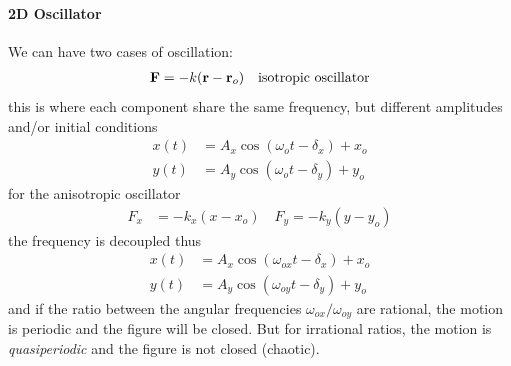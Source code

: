 \documentclass[../main.tex]{subfiles}
\begin{document}
\paragraph*{2D Oscillator} We can have two cases of oscillation:
\begin{align*}
    \vb{F} = -k (\vb{r} - \vb{r}_o) \quad \textrm{isotropic oscillator}
\end{align*}
this is where each component share the same frequency, but different amplitudes and/or initial
conditions
\begin{align*}
    x(t) &= A_x \cos(\omega_o t - \delta_x) + x_o \\
    y(t) &= A_y \cos(\omega_o t - \delta_y) + y_o
\end{align*}
for the anisotropic oscillator
\begin{align*}
    F_x &= -k_x (x - x_o) \quad F_y = -k_y (y - y_o)
\end{align*}
the frequency is decoupled thus
\begin{align*}
    x(t) &= A_x \cos(\omega_{ox} t - \delta_x) + x_o \\
    y(t) &= A_y \cos(\omega_{oy} t - \delta_y) + y_o
\end{align*}
and if the ratio between the angular frequencies $\omega_{ox} / \omega_{oy}$ are rational, the
motion is periodic and the figure will be closed. But for irrational ratios, the motion is
\emph{quasiperiodic} and the figure is not closed (chaotic).
\end{document}
